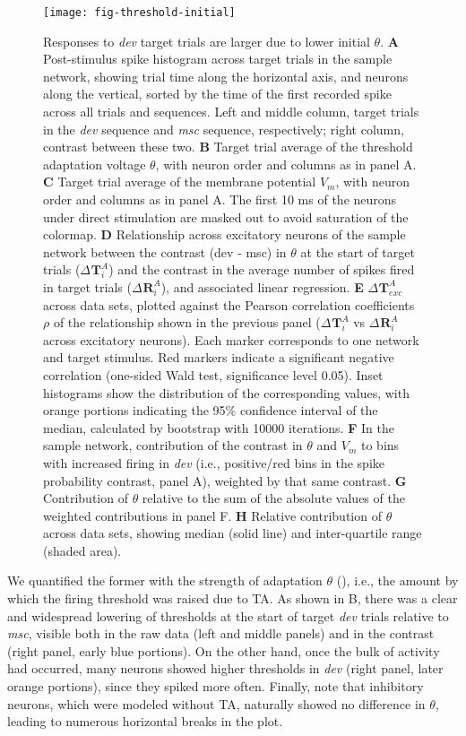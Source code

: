 \documentclass[9pt,lineno,onehalfspacing]{elife}
\newcommand{\dev}{\textit{dev}}
\newcommand{\msc}{\textit{msc}}
\newcommand{\R}[3][]{{}^{#1}_{}\boldsymbol R^{#2}_{#3}}
\newcommand{\T}[3][]{{}^{#1}_{}\boldsymbol T^{#2}_{#3}}
\begin{document}
\begin{figure}
    \texttt{[image: fig-threshold-initial]}
    \caption{%
        Responses to \dev{} target trials are larger due to lower initial $\theta$.
        \textbf{A} Post-stimulus spike histogram across target trials in the sample network, showing trial time along the horizontal axis, and neurons along the vertical, sorted by the time of the first recorded spike across all trials and sequences. Left and middle column, target trials in the \dev{} sequence and \msc{} sequence, respectively; right column, contrast between these two.
        \textbf{B} Target trial average of the threshold adaptation voltage $\theta$, with neuron order and columns as in panel A.
        \textbf{C} Target trial average of the membrane potential $V_m$, with neuron order and columns as in panel A. The first 10 ms of the neurons under direct stimulation are masked out to avoid saturation of the colormap.
        \textbf{D} Relationship across excitatory neurons of the sample network between the contrast (dev - msc) in $\theta$ at the start of target trials ($\Delta \T{A}{i}$) and the contrast in the average number of spikes fired in target trials ($\Delta \R{A}{i}$), and associated linear regression.
        \textbf{E} $\Delta \T{A}{exc}$ across data sets, plotted against the Pearson correlation coefficients $\rho$ of the relationship shown in the previous panel ($\Delta \T{A}{i}$ vs $\Delta \R{A}{i}$ across excitatory neurons). Each marker corresponds to one network and target stimulus. Red markers indicate a significant negative correlation (one-sided Wald test, significance level 0.05). Inset histograms show the distribution of the corresponding values, with orange portions indicating the 95\% confidence interval of the median, calculated by bootstrap with 10000 iterations.
        \textbf{F} In the sample network, contribution of the contrast in $\theta$ and $V_m$ to bins with increased firing in \dev{} (i.e., positive/red bins in the spike probability contrast, panel A), weighted by that same contrast.
        \textbf{G} Contribution of $\theta$ relative to the sum of the absolute values of the weighted contributions in panel F.
        \textbf{H} Relative contribution of $\theta$ across data sets, showing median (solid line) and inter-quartile range (shaded area).
    }
    \label{fig:threshold-initial}
\end{figure}

We quantified the former with the strength of adaptation $\theta$ (), i.e., the amount by which the firing threshold was raised due to TA. As shown in B, there was a clear and widespread lowering of thresholds at the start of target \dev{} trials relative to \msc{}, visible both in the raw data (left and middle panels) and in the contrast (right panel, early blue portions). On the other hand, once the bulk of activity had occurred, many neurons showed higher thresholds in \dev{} (right panel, later orange portions), since they spiked more often. Finally, note that inhibitory neurons, which were modeled without TA, naturally showed no difference in $\theta$, leading to numerous horizontal breaks in the plot.
\end{document}
